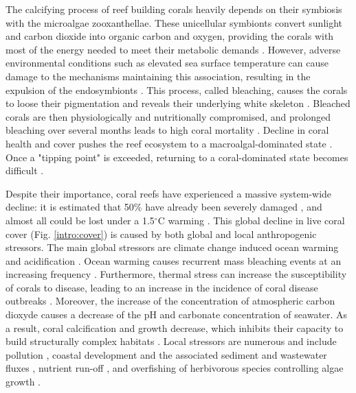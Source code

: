 The calcifying process of reef building corals heavily depends on their symbiosis with the microalgae zooxanthellae. These unicellular symbionts convert sunlight and carbon dioxide into organic carbon and oxygen, providing the corals with most of the energy needed to meet their metabolic demands \citep{muscatine1977reef}. However, adverse environmental conditions such as elevated sea surface temperature can cause damage to the mechanisms maintaining this association, resulting in the expulsion of the endosymbionts \citep{hoegh2007coral,van2022global}. This process, called bleaching, causes the corals to loose their pigmentation and reveals their underlying white skeleton \citep{baker2008climate}. Bleached corals are then physiologically and nutritionally compromised, and prolonged bleaching over several months leads to high coral mortality \citep{hughes2018spatial}. Decline in coral health and cover pushes the reef ecosystem to a macroalgal-dominated state \citep{hughes2003climate,mumby2007thresholds}. Once a "tipping point" is exceeded, returning to a coral-dominated state becomes difficult \citep{mumby2007thresholds,graham2015predicting}.

Despite their importance, coral reefs have experienced a massive system-wide decline: it is estimated  that 50\% have already been severely damaged \citep{hoegh2019people}, and almost all could be lost under a 1.5$^\circ$C warming \citep{dixon2022future}. This global decline in live coral cover \citep{gardner2003long,pandolfi2003global,pandolfi2011projecting,perry2013caribbean,dietzel2021population} (Fig. \ref{intro:cover}) is caused by both global and local anthropogenic stressors. The main global stressors are climate change induced ocean warming and acidification \citep{dove2020ocean,figueiredo2021global,dixon2022future}. Ocean warming causes recurrent mass bleaching events at an increasing frequency \citep{connell199730, hughes2018spatial,van2022global}. Furthermore, thermal stress can increase the susceptibility of corals to disease, leading to an increase in the incidence of coral disease outbreaks \citep{harvell2002climate,bruno2007thermal,muller2012caribbean,howells2020annual}. Moreover, the increase of the concentration of atmospheric carbon dioxyde causes a decrease of the pH and carbonate concentration of seawater. As a result, coral calcification and growth decrease, which inhibits their capacity to build structurally complex habitats \citep{hoegh2007coral,albright2016reversal}. Local stressors are numerous and include pollution \citep{loya1980effects,van2011chemical}, coastal development and the associated sediment and wastewater fluxes \citep{erftemeijer2012environmental, jones2015effects,jones2019sediment,cunning2019extensive}, nutrient run-off \citep{hughes2003climate,fabricius2005effects}, and overfishing of herbivorous species controlling algae growth \citep{jackson2001historical,shantz2020overfishing}.

